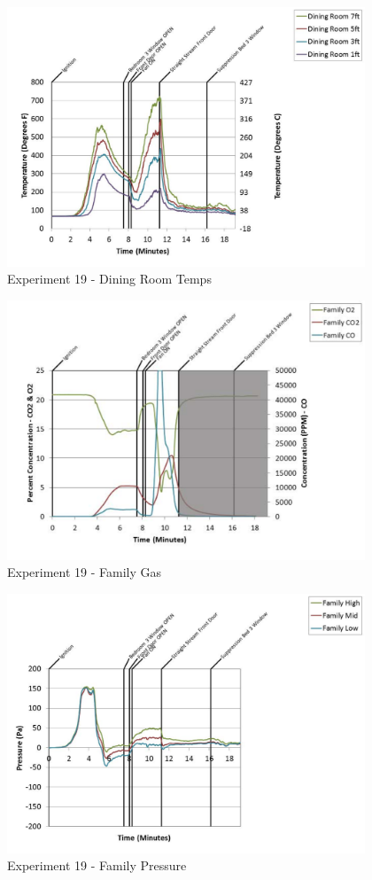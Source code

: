 \documentclass{article}
\begin{document}
\begin{appendices}
	\begin{figure}[h!]
		\centering
		\includegraphics[height=3.05in]{0_Images/Results_Charts/Exp_19_Charts/DiningRoomTemps.pdf}
		\caption{Experiment 19 - Dining Room Temps}
	\end{figure}
 
	\clearpage

	\begin{figure}[h!]
		\centering
		\includegraphics[height=3.05in]{0_Images/Results_Charts/Exp_19_Charts/FamilyGas.pdf}
		\caption{Experiment 19 - Family Gas}
	\end{figure}
 

	\begin{figure}[h!]
		\centering
		\includegraphics[height=3.05in]{0_Images/Results_Charts/Exp_19_Charts/FamilyPressure.pdf}
		\caption{Experiment 19 - Family Pressure}
	\end{figure}
 

\end{appendices}
\end{document}
